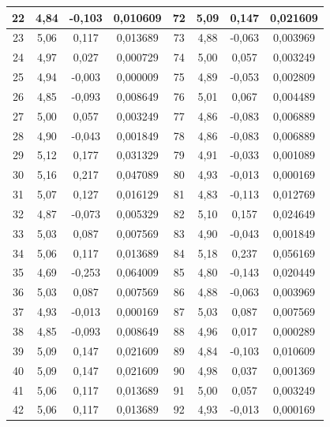 \documentclass[a4paper,12pt]{article}
\begin{document}
\begin{longtable}{|c|c|c|c|c|c|c|c|}
    22 & 4{,}84 & -0{,}103 & 0{,}010609 & 72  & 5{,}09 & 0{,}147  & 0{,}021609 \\ \hline
    23 & 5{,}06 & 0{,}117  & 0{,}013689 & 73  & 4{,}88 & -0{,}063 & 0{,}003969 \\ \hline
    24 & 4{,}97 & 0{,}027  & 0{,}000729 & 74  & 5{,}00 & 0{,}057  & 0{,}003249 \\ \hline
    25 & 4{,}94 & -0{,}003 & 0{,}000009 & 75  & 4{,}89 & -0{,}053 & 0{,}002809 \\ \hline
    26 & 4{,}85 & -0{,}093 & 0{,}008649 & 76  & 5{,}01 & 0{,}067  & 0{,}004489 \\ \hline
    27 & 5{,}00 & 0{,}057  & 0{,}003249 & 77  & 4{,}86 & -0{,}083 & 0{,}006889 \\ \hline
    28 & 4{,}90 & -0{,}043 & 0{,}001849 & 78  & 4{,}86 & -0{,}083 & 0{,}006889 \\ \hline
    29 & 5{,}12 & 0{,}177  & 0{,}031329 & 79  & 4{,}91 & -0{,}033 & 0{,}001089 \\ \hline
    30 & 5{,}16 & 0{,}217  & 0{,}047089 & 80  & 4{,}93 & -0{,}013 & 0{,}000169 \\ \hline
    31 & 5{,}07 & 0{,}127  & 0{,}016129 & 81  & 4{,}83 & -0{,}113 & 0{,}012769 \\ \hline
    32 & 4{,}87 & -0{,}073 & 0{,}005329 & 82  & 5{,}10 & 0{,}157  & 0{,}024649 \\ \hline
    33 & 5{,}03 & 0{,}087  & 0{,}007569 & 83  & 4{,}90 & -0{,}043 & 0{,}001849 \\ \hline
    34 & 5{,}06 & 0{,}117  & 0{,}013689 & 84  & 5{,}18 & 0{,}237  & 0{,}056169 \\ \hline
    35 & 4{,}69 & -0{,}253 & 0{,}064009 & 85  & 4{,}80 & -0{,}143 & 0{,}020449 \\ \hline
    36 & 5{,}03 & 0{,}087  & 0{,}007569 & 86  & 4{,}88 & -0{,}063 & 0{,}003969 \\ \hline
    37 & 4{,}93 & -0{,}013 & 0{,}000169 & 87  & 5{,}03 & 0{,}087  & 0{,}007569 \\ \hline
    38 & 4{,}85 & -0{,}093 & 0{,}008649 & 88  & 4{,}96 & 0{,}017  & 0{,}000289 \\ \hline
    39 & 5{,}09 & 0{,}147  & 0{,}021609 & 89  & 4{,}84 & -0{,}103 & 0{,}010609 \\ \hline
    40 & 5{,}09 & 0{,}147  & 0{,}021609 & 90  & 4{,}98 & 0{,}037  & 0{,}001369 \\ \hline
    41 & 5{,}06 & 0{,}117  & 0{,}013689 & 91  & 5{,}00 & 0{,}057  & 0{,}003249 \\ \hline
    42 & 5{,}06 & 0{,}117  & 0{,}013689 & 92  & 4{,}93 & -0{,}013 & 0{,}000169 \\ \hline

\end{longtable}
\end{document}
